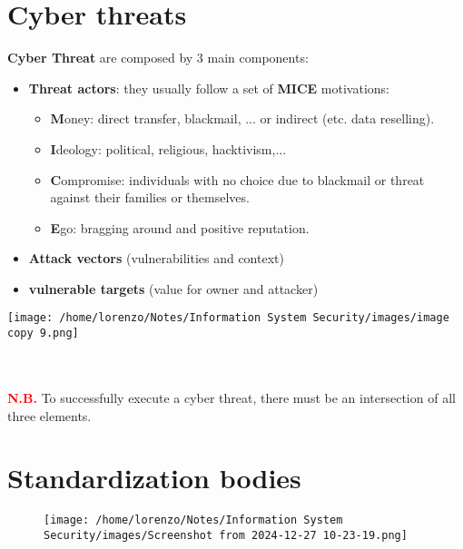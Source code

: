 \section{Cyber threats}
\begin{minipage}{0.7\textwidth}
\textbf{Cyber Threat} are composed by 3 main components:
\begin{itemize}
    \item \textbf{Threat actors}: they usually follow a set of \textbf{MICE} motivations:
    \begin{itemize}
        \item \textbf{M}oney: direct transfer, blackmail, ... or indirect (etc. data reselling).
        \item \textbf{I}deology: political, religious, hacktivism,...
        \item \textbf{C}ompromise: individuals with no choice due to blackmail or threat against their families or themselves.
        \item \textbf{E}go: bragging around and positive reputation.

    \end{itemize}
    \item \textbf{Attack vectors} (vulnerabilities and context)
    \item \textbf{vulnerable targets} (value for owner and attacker)
\end{itemize} 
\end{minipage} 
\hspace{0.3cm}
\begin{minipage}{0.4\textwidth}
    \texttt{[image: /home/lorenzo/Notes/Information System Security/images/image copy 9.png]}
\end{minipage}
\\
\\
\noindent
\textcolor{red}{\textbf{N.B.}} To successfully execute a cyber threat, there must be an intersection of all three elements.


\section{Standardization bodies}
\begin{figure}[H]
    \centering
    \texttt{[image: /home/lorenzo/Notes/Information System Security/images/Screenshot from 2024-12-27 10-23-19.png]}
\end{figure}

